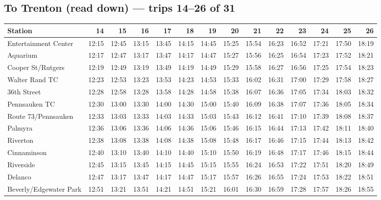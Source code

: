 \subsection*{To Trenton (read down) --- trips 14--26 of 31}
\begin{center}\footnotesize\setlength{\tabcolsep}{3pt}\begin{tabular}{@{}lrrrrrrrrrrrrr@{}}\toprule
Station & 14 & 15 & 16 & 17 & 18 & 19 & 20 & 21 & 22 & 23 & 24 & 25 & 26 \\\midrule
Entertainment Center & 12:15 & 12:45 & 13:15 & 13:45 & 14:15 & 14:45 & 15:25 & 15:54 & 16:23 & 16:52 & 17:21 & 17:50 & 18:19 \\
Aquarium & 12:17 & 12:47 & 13:17 & 13:47 & 14:17 & 14:47 & 15:27 & 15:56 & 16:25 & 16:54 & 17:23 & 17:52 & 18:21 \\
Cooper St/Rutgers & 12:19 & 12:49 & 13:19 & 13:49 & 14:19 & 14:49 & 15:29 & 15:58 & 16:27 & 16:56 & 17:25 & 17:54 & 18:23 \\
Walter Rand TC & 12:23 & 12:53 & 13:23 & 13:53 & 14:23 & 14:53 & 15:33 & 16:02 & 16:31 & 17:00 & 17:29 & 17:58 & 18:27 \\
36th Street & 12:28 & 12:58 & 13:28 & 13:58 & 14:28 & 14:58 & 15:38 & 16:07 & 16:36 & 17:05 & 17:34 & 18:03 & 18:32 \\
Pennsauken TC & 12:30 & 13:00 & 13:30 & 14:00 & 14:30 & 15:00 & 15:40 & 16:09 & 16:38 & 17:07 & 17:36 & 18:05 & 18:34 \\
Route 73/Pennsauken & 12:33 & 13:03 & 13:33 & 14:03 & 14:33 & 15:03 & 15:43 & 16:12 & 16:41 & 17:10 & 17:39 & 18:08 & 18:37 \\
Palmyra & 12:36 & 13:06 & 13:36 & 14:06 & 14:36 & 15:06 & 15:46 & 16:15 & 16:44 & 17:13 & 17:42 & 18:11 & 18:40 \\
Riverton & 12:38 & 13:08 & 13:38 & 14:08 & 14:38 & 15:08 & 15:48 & 16:17 & 16:46 & 17:15 & 17:44 & 18:13 & 18:42 \\
Cinnaminson & 12:40 & 13:10 & 13:40 & 14:10 & 14:40 & 15:10 & 15:50 & 16:19 & 16:48 & 17:17 & 17:46 & 18:15 & 18:44 \\
Riverside & 12:45 & 13:15 & 13:45 & 14:15 & 14:45 & 15:15 & 15:55 & 16:24 & 16:53 & 17:22 & 17:51 & 18:20 & 18:49 \\
Delanco & 12:47 & 13:17 & 13:47 & 14:17 & 14:47 & 15:17 & 15:57 & 16:26 & 16:55 & 17:24 & 17:53 & 18:22 & 18:51 \\
Beverly/Edgewater Park & 12:51 & 13:21 & 13:51 & 14:21 & 14:51 & 15:21 & 16:01 & 16:30 & 16:59 & 17:28 & 17:57 & 18:26 & 18:55 \\

\end{tabular}
\end{center}
